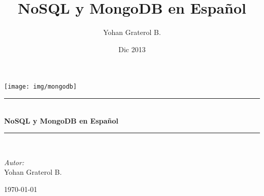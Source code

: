 \documentclass[a4paper, pdftex, 14pt, oneside, titlepage, openany, onecolumn]{book}
\newcommand{\HRule}{\rule{\linewidth}{0.5mm}}
\begin{document}
 
\pagestyle{fancy}
\renewcommand\headrulewidth{0pt}
\setlength{\parskip}{16pt}
\onehalfspace
\lhead{}

\author{Yohan Graterol B.}
\title{NoSQL y MongoDB en Español}
\date{Dic 2013}

\begin{titlepage}
	\begin{center}
		\texttt{[image: img/mongodb]}
		\HRule \\[0.4cm]
		{ \huge \bfseries NoSQL y MongoDB en Español \\[0.4cm] }

		\HRule \\[1.5cm]
		
		\begin{minipage}{0.4\textwidth}
			\begin{flushleft} \large
				\emph{Autor:}\\
				Yohan {Graterol B.}
			\end{flushleft}
		\end{minipage}
	    \begin{minipage}{0.4\textwidth}
			\begin{flushright} \large
			\end{flushright}
		\end{minipage}

		\vfill

		{\large \today}
	\end{center}
\end{titlepage}

\newpage
\mbox{}
\thispagestyle{empty} 



\tableofcontents









\backmatter
 

\printindex
\end{document}
